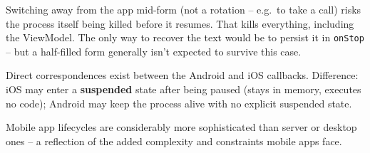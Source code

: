 \begin{warnbox}[title=A different risk: switching away]
Switching away from the app mid-form (not a rotation -- e.g.\ to take a call) risks the process itself being killed before it resumes. That kills everything, including the ViewModel. The only way to recover the text would be to persist it in \texttt{onStop} -- but a half-filled form generally isn't expected to survive this case.
\end{warnbox}

\begin{rembox}[title=iOS has a similar lifecycle]
Direct correspondences exist between the Android and iOS callbacks. Difference: iOS may enter a \textbf{suspended} state after being paused (stays in memory, executes no code); Android may keep the process alive with no explicit suspended state.
\end{rembox}

\begin{keybox}
Mobile app lifecycles are considerably more sophisticated than server or desktop ones -- a reflection of the added complexity and constraints mobile apps face.
\end{keybox}
